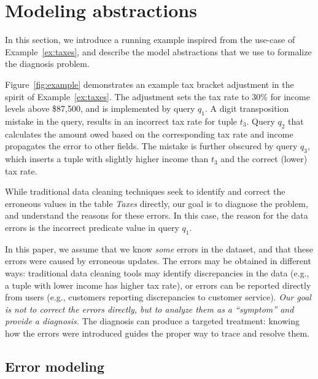 
\section{Modeling abstractions}
\label{sec:abstractions}

In this section, we introduce a running example inspired from the use-case of
Example~\ref{ex:taxes}, and describe the model abstractions that we use to
formalize the diagnosis problem.





\begin{example}\label{ex:taxes2}
    
Figure~\ref{fig:example} demonstrates an example tax bracket adjustment in the
spirit of Example~\ref{ex:taxes}. The adjustment sets the tax rate to 30\% for
income levels above \$87,500, and is implemented by query $q_1$. A digit
transposition mistake in the query, results in an incorrect tax rate for tuple
$t_3$. Query $q_2$ that calculates the amount owed based on the corresponding
tax rate and income propagates the error to other fields. The mistake is
further obscured by query $q_3$, which inserts a tuple with slightly higher
income than $t_3$ and the correct (lower) tax rate.

\end{example}
% 
While traditional data cleaning techniques seek to identify and correct the
erroneous values in the table \emph{Taxes} directly, our goal is to diagnose
the problem, and understand the reasons for these errors. In this case, the
reason for the data errors is the incorrect predicate value in query $q_1$.

In this paper, we assume that we know \emph{some} errors in the dataset, and
that these errors were caused by erroneous updates. The errors may be
obtained in different ways: traditional data cleaning tools may identify
discrepancies in the data (e.g., a tuple with lower income has higher tax
rate), or errors can be reported directly from users (e.g., customers
reporting discrepancies to customer service). \emph{Our goal is not to correct
the errors directly, but to analyze them as a ``symptom'' and provide a
diagnosis.} The diagnosis can produce a targeted treatment: knowing how the
errors were introduced guides the proper way to trace and resolve them.




\subsection{Error modeling}
\label{sec:model}

